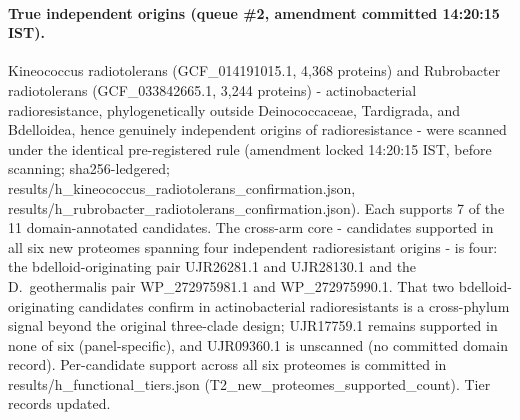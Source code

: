 \documentclass[12pt,a4paper]{article}
\begin{document}
\paragraph{True independent origins (queue \#2, amendment committed 14:20:15 IST).} Kineococcus radiotolerans (GCF\_014191015.1, 4{,}368 proteins) and Rubrobacter radiotolerans (GCF\_033842665.1, 3{,}244 proteins) - actinobacterial radioresistance, phylogenetically outside Deinococcaceae, Tardigrada, and Bdelloidea, hence genuinely independent origins of radioresistance - were scanned under the identical pre-registered rule (amendment locked 14:20:15 IST, before scanning; sha256-ledgered; results/h\_kineococcus\_radiotolerans\_confirmation.json, results/h\_rubrobacter\_radiotolerans\_confirmation.json). Each supports 7 of the 11 domain-annotated candidates. The cross-arm core - candidates supported in all six new proteomes spanning four independent radioresistant origins - is four: the bdelloid-originating pair UJR26281.1 and UJR28130.1 and the D.\ geothermalis pair WP\_272975981.1 and WP\_272975990.1. That two bdelloid-originating candidates confirm in actinobacterial radioresistants is a cross-phylum signal beyond the original three-clade design; UJR17759.1 remains supported in none of six (panel-specific), and UJR09360.1 is unscanned (no committed domain record). Per-candidate support across all six proteomes is committed in results/h\_functional\_tiers.json (T2\_new\_proteomes\_supported\_count). Tier records updated.
\end{document}
